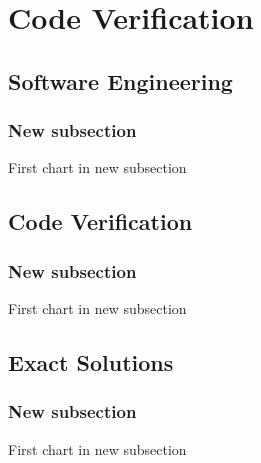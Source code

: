 % 

\section{Code Verification}

\subsection{Software Engineering}
\begin{frame}\frametitle{New subsection}
	First chart in new subsection
\end{frame}

\subsection{Code Verification}
\begin{frame}\frametitle{New subsection}
	First chart in new subsection
\end{frame}

\subsection{Exact Solutions}
\begin{frame}\frametitle{New subsection}
	First chart in new subsection
\end{frame}


\endinput  %
